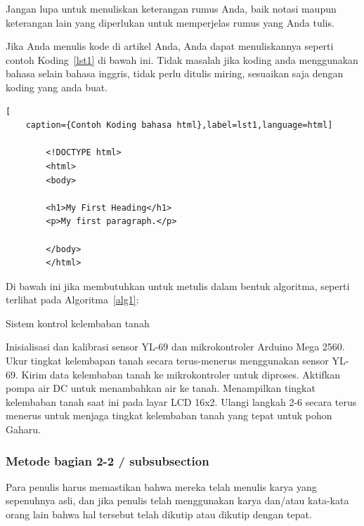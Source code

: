 \documentclass[
 manuscript=article,  %
  layout=publish, 
  year=2024, 
  month= Februari, %
  volume=8,
  number=1 
]{JIKO}
\begin{document}
Jangan lupa untuk menuliskan keterangan rumus Anda, baik notasi maupun keterangan lain yang diperlukan untuk memperjelas rumus yang Anda tulis.

Jika Anda menulis kode di artikel Anda, Anda dapat menuliskannya seperti contoh Koding~\ref{lst1} di bawah ini. Tidak masalah jika koding anda menggunakan bahasa selain bahasa inggris, tidak perlu ditulis miring, sesuaikan saja dengan koding yang anda buat.

\renewcommand{\lstlistingname}{Koding}
\begin{lstlisting}[
	caption={Contoh Koding bahasa html},label=lst1,language=html]
	
		<!DOCTYPE html>
		<html>
		<body>
		
		<h1>My First Heading</h1>
		<p>My first paragraph.</p>
		
		</body>
		</html>

\end{lstlisting}

Di bawah ini jika membutuhkan untuk metulis dalam bentuk algoritma, seperti terlihat pada Algoritma~\ref{alg1}:

\renewcommand{\algorithmname}{Algoritma}
\begin{algorithm}
	\caption{Sistem kontrol kelembaban tanah}\label{alg1}
	\begin{algorithmic}
		\State Inisialisasi dan kalibrasi sensor YL-69 dan mikrokontroler Arduino Mega 2560.
		\State Ukur tingkat kelembapan tanah secara terus-menerus menggunakan sensor YL-69.
		\State Kirim data kelembaban tanah ke mikrokontroler untuk diproses.
		\State Aktifkan pompa air DC untuk menambahkan air ke tanah.
		\EndIf
		\State Menampilkan tingkat kelembaban tanah saat ini pada layar LCD 16x2.
		\EndWhile
		\State Ulangi langkah 2-6 secara terus menerus untuk menjaga tingkat kelembaban tanah yang tepat untuk pohon Gaharu.
	\end{algorithmic}
\end{algorithm}

\subsubsection{Metode bagian 2-2 / subsubsection}

Para penulis harus memastikan bahwa mereka telah menulis karya yang sepenuhnya asli, dan jika penulis telah menggunakan karya dan/atau kata-kata orang lain bahwa hal tersebut telah dikutip atau dikutip dengan tepat. 
\end{document}
